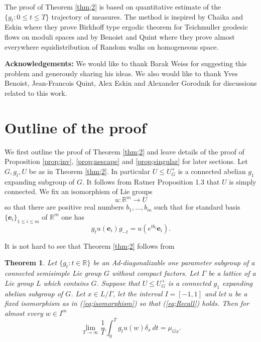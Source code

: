 \documentclass[12pt]{amsart}
\newtheorem{thm}{Theorem}[section]
\theoremstyle{definition}
\theoremstyle{remark}
\numberwithin{equation}{section}
\begin{document}
The proof of Theorem \ref{thm;2} is based on
  quantitative estimate of the
$\{g_t: 0\le t\le T\}$ trajectory of  measures. The method is inspired by 
 Chaika and  Eskin \cite{ce} where they prove 
Birkhoff type ergodic theorem for Teichmuller geodesic flows on moduli spaces and 
 by Benoist and Quint \cite{bq132} where they prove almost everywhere equidistribution of Random walks on 
homogeneous space. 

\textbf{Acknowledgements:}
We would like to thank  Barak Weiss for suggesting  this problem and generously 
sharing his ideas. 
We also would like to thank Yves Benoist, Jean-Francois Quint, 
Alex Eskin and Alexander Gorodnik for discussions related to this work. 

\section{Outline of the proof}\label{s;outline}

We first  outline the proof of Theorem \ref{thm;2} and leave details of the proof of Proposition 
\ref{prop;inv}, \ref{prop;nescape} and \ref{prop;singular} for later sections. 
Let $ G, g_t, U$ be as in Theorem \ref{thm;2}. 
In particular 
$U\le U_G^+$ is a connected abelian $g_1$ expanding  subgroup   of $G$. 
It follows from Ratner \cite{r90} Proposition 1.3 that 
$U$ is  simply 
 connected. We fix an isomorphism of Lie groups 
 \begin{equation}\label{eq;isomorphism}
 u:\mathbb R^m\to U
 \end{equation}
 so that there are positive real numbers $b_1, \ldots, b_m$ 
 such that  for  standard basis $\{\mathbf e_i\}_{1\le i\le m}$
of $\mathbb R^m $ one has 
\begin{equation}\label{eq;Recall}
g_tu(\mathbf e_i)g_{-t}=u(e^{tb_i}\mathbf e_i).
\end{equation}

It is not hard to see that  Theorem \ref{thm;2} follows  from 
\begin{thm}\label{thm;proof}
Let  $\{g_t :t\in \mathbb R\}$ be an  Ad-diagonalizable
one parameter subgroup of a connected semisimple Lie group  $G$ without compact factors.
Let $\Gamma$ be a lattice of a Lie group  $L$ which
contains $G$.  
Suppose that  $U\le U_G^+$ is a connected  $ g_1 $ expanding abelian  subgroup of $G$.
Let $x\in L/\Gamma$, let the interval $I=[-1, 1]$ and let $u$ be a fixed isomorphism as in (\ref{eq;isomorphism})
so that (\ref{eq;Recall}) holds. Then 
 for almost every $w\in I^m$ 
  \begin{equation}\label{eq;goalpoint}
\lim_{T\to \infty}  \frac{1}{T}\int_0^T g_tu(w)\delta_{x} \, dt=\mu_{\overline{Gx}}.
\end{equation}
\end{thm}
 
\end{document}

